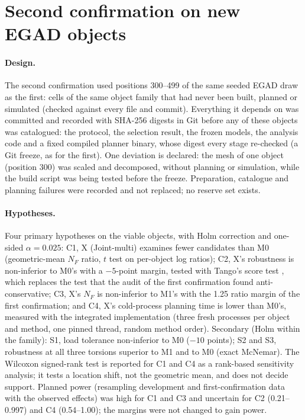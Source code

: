 \section{Second confirmation on new EGAD objects}\label{sec:newconf}

\paragraph{Design.} The second confirmation used positions 300--499 of the same seeded EGAD draw as the first: \nxObjects{} cells of the same object family that had never been built, planned or simulated (checked against every file and commit). Everything it depends on was committed and recorded with SHA-256 digests in Git before any of these objects was catalogued: the protocol, the selection result, the frozen models, the analysis code and a fixed compiled planner binary, whose digest every stage re-checked (a Git freeze, as for the first). One deviation is declared: the mesh of one object (position 300) was scaled and decomposed, without planning or simulation, while the build script was being tested before the freeze. Preparation, catalogue and planning failures were recorded and not replaced; no reserve set exists.

\paragraph{Hypotheses.} Four primary hypotheses on the viable objects, with Holm correction and one-sided $\alpha=0.025$: C1, X (Joint-multi) examines fewer candidates than M0 (geometric-mean $N_F$ ratio, $t$ test on per-object log ratios); C2, X's robustness is non-inferior to M0's with a $-5$-point margin, tested with Tango's score test \cite{tango1998}, which replaces the test that the audit of the first confirmation found anti-conservative; C3, X's $N_F$ is non-inferior to M1's with the 1.25 ratio margin of the first confirmation; and C4, X's cold-process planning time is lower than M0's, measured with the integrated implementation (three fresh processes per object and method, one pinned thread, random method order). Secondary (Holm within the family): S1, load tolerance non-inferior to M0 ($-10$ points); S2 and S3, robustness at all three torsions superior to M1 and to M0 (exact McNemar). The Wilcoxon signed-rank test is reported for C1 and C4 as a rank-based sensitivity analysis; it tests a location shift, not the geometric mean, and does not decide support. Planned power (resampling development and first-confirmation data with the observed effects) was high for C1 and C3 and uncertain for C2 (0.21--0.997) and C4 (0.54--1.00); the margins were not changed to gain power.

